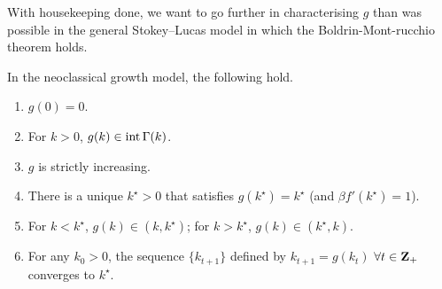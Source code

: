 \documentclass[11pt,letterpaper,reqno,oneside]{article}
\begin{document}
With housekeeping done, we want to go further in characterising $g$ than was possible in the general Stokey--Lucas model in which the Boldrin-Mont-\allowbreak rucchio theorem holds.
%
\begin{proposition}
	\label{proposition:neoclassical_growth_properties_of_g}
	In the neoclassical growth model, the following hold.
	\begin{enumerate}

		\item $g(0) = 0$.

		\item For $k>0$, $g(k) \in \operatorname*{int} \Gamma(k)$.

		\item $g$ is strictly increasing.

		\item There is a unique $k^\star > 0$ that satisfies $g(k^\star) = k^\star$ (and $\beta f'(k^\star) = 1$).

		\item For $k < k^\star$, $g(k) \in (k,k^\star)$; for $k > k^\star$, $g(k) \in (k^\star,k)$.

		\item For any $k_0 > 0$, the sequence $\{ k_{t+1} \}$ defined by $k_{t+1} = g(k_t)$ $\forall t \in \mathbf{Z}_+$ converges to $k^\star$.

	\end{enumerate}
\end{proposition}
\end{document}
